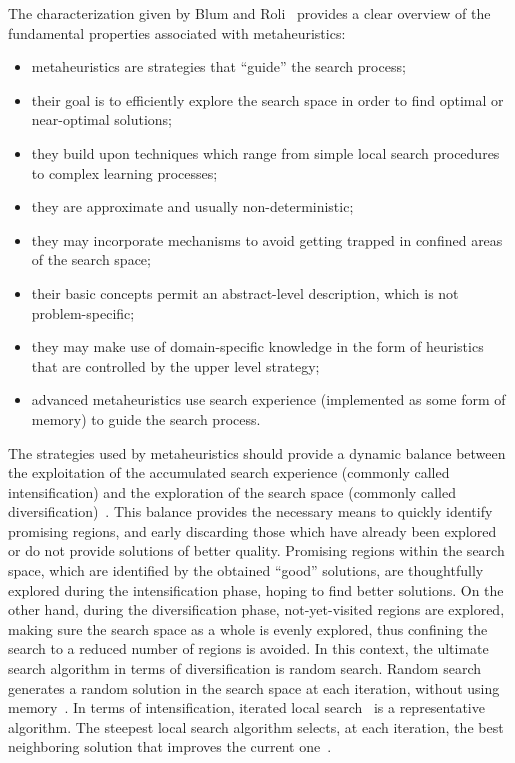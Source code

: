 The characterization given by Blum and Roli~\cite{Blum-Metaheuristics_in_combinatorial_optimization_overview_and_coconceptual_comparison:2003}
provides a clear overview of the fundamental properties associated
with metaheuristics:
\begin{itemize}
\item metaheuristics are strategies that \textquotedblleft{}guide\textquotedblright{}
the search process;
\item their goal is to efficiently explore the search space in order to
find optimal or near-optimal solutions;
\item they build upon techniques which range from simple local search procedures
to complex learning processes;
\item they are approximate and usually non-deterministic;
\item they may incorporate mechanisms to avoid getting trapped in confined
areas of the search space;
\item their basic concepts permit an abstract-level description, which is
not problem-specific;
\item they may make use of domain-specific knowledge in the form of heuristics
that are controlled by the upper level strategy;
\item advanced metaheuristics use search experience (implemented as some
form of memory) to guide the search process.
\end{itemize}
The strategies used by metaheuristics should provide a dynamic balance
between the exploitation of the accumulated search experience (commonly
called intensification) and the exploration of the search space (commonly
called diversification)~\cite{Blum-Metaheuristics_in_combinatorial_optimization_overview_and_coconceptual_comparison:2003}.
This balance provides the necessary means to quickly identify promising
regions, and early discarding those which have already been explored
or do not provide solutions of better quality. Promising regions within
the search space, which are identified by the obtained ``good''
solutions, are thoughtfully explored during the intensification phase,
hoping to find better solutions. On the other hand, during the diversification
phase, not-yet-visited regions are explored, making sure the search
space as a whole is evenly explored, thus confining the search to
a reduced number of regions is avoided. In this context, the ultimate
search algorithm in terms of diversification is random search. Random
search generates a random solution in the search space at each iteration,
without using memory~\cite{Talbi_Metaheuristics:2009}. In terms
of intensification, iterated local search~\cite{Lourencco-Iterated_local_search:2003}
is a representative algorithm. The steepest local search algorithm
selects, at each iteration, the best neighboring solution that improves
the current one~\cite{Talbi_Metaheuristics:2009}.

